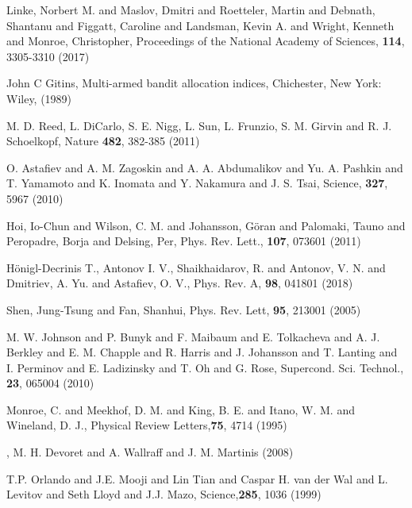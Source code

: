 
\begin{thebibliography}{99}

 Linke,  Norbert M. and Maslov,  Dmitri and Roetteler, Martin  and Debnath,
  Shantanu  and Figgatt,  Caroline and  Landsman, Kevin  A.  and  Wright, Kenneth  and Monroe,
  Christopher, Proceedings of the National Academy of Sciences, \textbf{114}, 3305-3310 (2017)

 John  C Gitins, Multi-armed  bandit allocation indices,  Chichester, New
  York: Wiley, (1989)
        
 {M.  D. Reed, L. DiCarlo, S. E. Nigg, L. Sun, L.  Frunzio, S. M. Girvin and
    R. J. Schoelkopf}, Nature \textbf{482}, 382-385 (2011)

 O.  Astafiev  and A.  M.  Zagoskin  and A.  A.  Abdumalikov  and Yu. A.
  Pashkin  and T.   Yamamoto and  K.  Inomata  and  Y.  Nakamura  and J.   S.  Tsai,  Science,
  \textbf{327}, 5967 (2010)

 Hoi, Io-Chun and Wilson, C.   M.  and Johansson, G\"oran and Palomaki, Tauno
  and Peropadre, Borja and Delsing, Per, Phys. Rev.  Lett., \textbf{107}, 073601 (2011)

 H\"onigl-Decrinis T., Antonov I. V., Shaikhaidarov, R. and Antonov, V. N.
  and Dmitriev, A.  Yu.  and Astafiev, O.  V., Phys. Rev.  A, \textbf{98}, 041801 (2018)

 Shen, Jung-Tsung  and Fan, Shanhui, Phys.  Rev.   Lett, \textbf{95}, 213001
  (2005)

 {M.  W.  Johnson and P.  Bunyk  and F.  Maibaum and E. Tolkacheva and A.
    J.  Berkley  and E.   M. Chapple and  R. Harris and  J.  Johansson  and T. Lanting  and I.
    Perminov  and E.   Ladizinsky  and T.   Oh  and G.   Rose},  {Supercond. Sci.   Technol.},
  \textbf{23}, {065004} (2010)
    
 {Monroe, C.   and Meekhof, D. M.  and  King, B. E. and Itano,  W.  M. and
    Wineland, D.  J.}, {Physical Review Letters},\textbf{75}, 4714 (1995)

, {M. H. Devoret and A. Wallraff and J. M. Martinis} (2008)

 {T.P. Orlando and J.E. Mooji and Lin  Tian and Caspar H. van der Wal and
    L. Levitov and Seth Lloyd and J.J. Mazo}, {Science},\textbf{285}, {1036} (1999)


\end{thebibliography}
